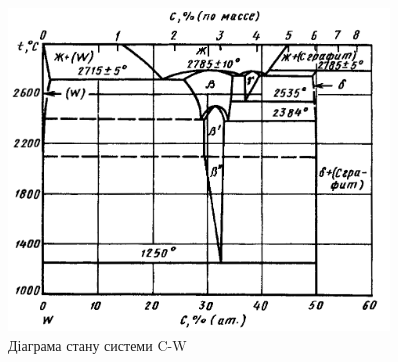 \documentclass[a4paper,fontsize=14bp,ukrainian]{extreport}
\begin{document}
\begin{appendices}
\setcounter{chapter}{0}

\label{app:phase_diagrams}

\begin{figure}[h!]
\centering
\includegraphics[width=0.9\textwidth]{C-W.png}
\caption{Діаграма стану системи C-W~\cite{diag1997t1}}
\label{fig:phase_diag_C-W}
\end{figure}


\end{appendices}
\end{document}
